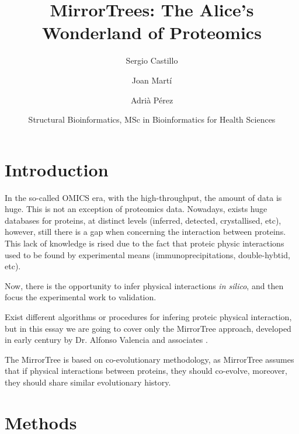 \documentclass[11pt]{article}
\title{MirrorTrees: The Alice's Wonderland of Proteomics}
\author{
	Sergio Castillo
	\and
	Joan Martí
	\and
	Adrià Pérez
}
\date{Structural Bioinformatics, MSc in Bioinformatics for Health Sciences}
\begin{document}
\maketitle

\section{Introduction}
In the so-called OMICS era, with the high-throughput, the amount of data is huge. This is not an exception of proteomics data. Nowadays, exists huge databases for proteins, at distinct levels (inferred, detected, crystallised, etc), however, still there is a gap when concerning the interaction between proteins. This lack of knowledge is rised due to the fact that proteic physic interactions used to be found by experimental means (immunoprecipitations, double-hybtid, etc).


Now, there is the opportunity to infer physical interactions \textit{in silico}, and then focus the experimental work to validation.

Exist different algorithms or procedures for infering proteic physical interaction, but in this essay we are going to cover only the MirrorTree approach, developed in early century by Dr. Alfonso Valencia and associates \cite{Pazos2001}.

The MirrorTree is based on co-evolutionary methodology, as MirrorTree assumes that if physical interactions between proteins, they should co-evolve, moreover, they should share similar evolutionary history.


\section{Methods}
\end{document}
